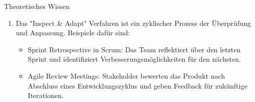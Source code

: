\documentclass{article}
\begin{document}
\begin{exercise}{Theoretisches Wissen}
\begin{solution}
\begin{enumerate}
      \item Das "Inspect \& Adapt" Verfahren ist ein zyklischer Prozess der Überprüfung und Anpassung. Beispiele dafür sind:
            \begin{itemize}
              \item Sprint Retrospective in Scrum: Das Team reflektiert über den letzten Sprint und identifiziert Verbesserungsmöglichkeiten für den nächsten.
              \item Agile Review Meetings: Stakeholder bewerten das Produkt nach Abschluss eines Entwicklungszyklus und geben Feedback für zukünftige Iterationen.
            \end{itemize}
    \end{enumerate}
  \end{solution}

\end{exercise}
\end{document}
